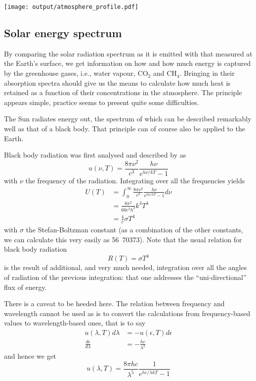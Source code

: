 \documentclass[10pt,a4paper,titlepage]{article}
\begin{document}
\texttt{[image: output/atmosphere\_profile.pdf]}

\subsection{Solar energy spectrum}
\label{sec-3-2}
By comparing the solar radiation spectrum as it is emitted with that
measured at the Earth's surface, we get information on how and how
much energy is captured by the greenhouse gases, i.e., water vapour,
CO$_{\text{2}}$ and CH$_{\text{4}}$. Bringing in their absorption spectra should give us
the means to calculate how much heat is retained as a function of
their concentrations in the atmosphere. The principle appears simple,
practice seems to present quite some difficulties.

The Sun radiates energy out, the spectrum of which can be described
remarkably well as that of a black body. That principle can of course
also be applied to the Earth.

Black body radiation was first analysed and described by
\citet{planck00:energieverteilung} as
\begin{equation}
u(\nu, T) = \frac{8 \pi \nu^2}{c^3} \frac{h \nu}{e^{h \nu / k T} - 1}
\end{equation}
with $\nu$ the frequency of the radiation. Integrating over all the
frequencies yields
\begin{equation}
\begin{split}
U(T) & = \int_0^\infty \frac{8 \pi \nu^2}{c^3} \frac{h \nu}{e^{h \nu / k T} - 1} d \nu\\
     & = \frac{8 \pi^2}{60 c^3 h^3}k^4 T^4 \\
     & = \frac{4}{c} \sigma T^4
\end{split}
\end{equation}
with $\sigma$ the Stefan-Boltzman constant (as a combination of the
other constants, we can calculate this very easily as
\unit{56.70373}{\nano\watt\per\metre\squared\fourth\kelvin}). Note
that the usual relation for black body radiation
\begin{equation}
R(T) = \sigma T^4
\end{equation}
is the result of additional, and very much needed, integration over
all the angles of radiation of the previous integration: that one
addresses the ``uni-directional'' flux of energy.

There is a caveat to be heeded here. The relation between frequency
and wavelength cannot be used as is to convert the calculations from
frequency-based values to wavelength-based ones, that is to say
\begin{equation}
\begin{split}
u(\lambda, T) d\lambda & = -u(\epsilon, T) d\epsilon \\
\frac{d\epsilon}{d\lambda} & = -\frac{h c}{\lambda^2}
\end{split}
\end{equation}
and hence we get
\begin{equation}
u(\lambda, T) = \frac{8 \pi h c}{\lambda^5} \frac{1}{e^{h c /\lambda k T} - 1}
\end{equation}
\end{document}
